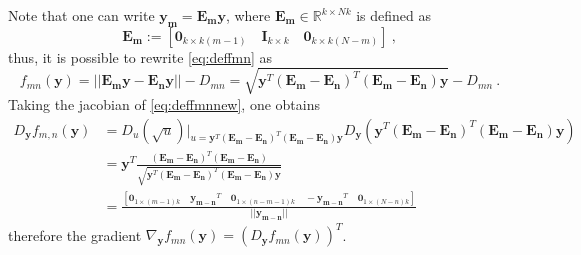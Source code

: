 \documentclass[12pt]{article}
\begin{document}
Note that one can write $\mathbf{y_m} = \mathbf{E_m}\mathbf{y}$, where $\mathbf{E_m}\in \mathbb{R}^{k\times Nk}$ is defined as 
\begin{equation*}\label{key}
\mathbf{E_m} := \left[\mathbf{0}_{k\times k(m-1)} \quad \mathbf{I}_{k\times k} \quad \mathbf{0}_{k\times k(N-m)}  \right]\:, 
\end{equation*}
thus, it is possible to rewrite \eqref{eq:deffmn} as
\begin{equation}\label{eq:deffmnnew}
f_{mn}(\mathbf{y}) = ||\mathbf{E_m}\mathbf{y}-\mathbf{E_n}\mathbf{y}||-D_{mn} = \sqrt{\mathbf{y}^T(\mathbf{E_m}-\mathbf{E_n})^T(\mathbf{E_m}-\mathbf{E_n})\mathbf{y}}-D_{mn}\:.
\end{equation}
Taking the jacobian of \eqref{eq:deffmnnew}, one obtains
\begin{equation}\label{eq:gradfmn}
\begin{split}
D_{\mathbf{y}}f_{m,n}(\mathbf{y}) &= D_u(\sqrt{u})\biggr\rvert_{u = \mathbf{y}^T(\mathbf{E_m}-\mathbf{E_n})^T(\mathbf{E_m}-\mathbf{E_n})\mathbf{y}}D_{\mathbf{y}}(\mathbf{y}^T(\mathbf{E_m}-\mathbf{E_n})^T(\mathbf{E_m}-\mathbf{E_n})\mathbf{y})\\
&= \mathbf{y}^T\frac{(\mathbf{E_m}-\mathbf{E_n})^T(\mathbf{E_m}-\mathbf{E_n})}{\sqrt{\mathbf{y}^T(\mathbf{E_m}-\mathbf{E_n})^T(\mathbf{E_m}-\mathbf{E_n})\mathbf{y}}}\\
&=\frac{\left[\mathbf{0}_{1\times(m-1)k} \quad  \mathbf{y_{m-n}}^T \quad \mathbf{0}_{1\times(n-m-1)k} \quad -\mathbf{y_{m-n}}^T \quad \mathbf{0}_{1\times(N-n)k}  \right]}{||\mathbf{y_{m-n}}||}
\end{split}
\end{equation}
therefore the gradient $\nabla_{\mathbf{y}} f_{mn}(\mathbf{y}) = \left(D_{\mathbf{y}}f_{mn}(\mathbf{y})\right)^T$.

\end{document}
